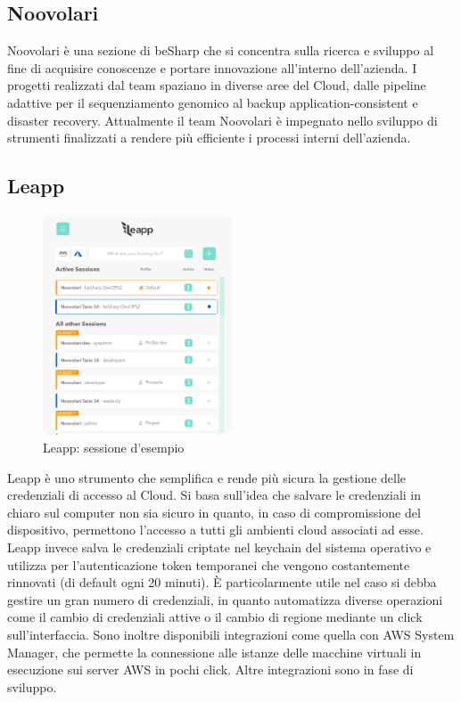 \documentclass[a4paper]{article}
\begin{document}
\subsection{Noovolari}
Noovolari è una sezione di beSharp che si concentra sulla ricerca e sviluppo al fine di acquisire conoscenze e portare innovazione all'interno dell'azienda. I progetti realizzati dal team spaziano in diverse aree del Cloud, dalle pipeline adattive per il sequenziamento genomico al backup application-consistent e disaster recovery. Attualmente il team Noovolari è impegnato nello sviluppo di strumenti finalizzati a rendere più efficiente i processi interni dell'azienda.\cite{noovolari}

\subsection{Leapp}
\begin{figure}[ht]
    \centering
    \includegraphics[width=0.5\textwidth]{Risorse/leapp.png}
    \caption{Leapp: sessione d'esempio}
\end{figure}
Leapp è uno strumento che semplifica e rende più sicura la gestione delle credenziali di accesso al Cloud. Si basa sull'idea che salvare le credenziali in chiaro sul computer non sia sicuro in quanto, in caso di compromissione del dispositivo, permettono l'accesso a tutti gli ambienti cloud associati ad esse. Leapp invece salva le credenziali criptate nel keychain del sistema operativo e utilizza per l'autenticazione token temporanei che vengono costantemente rinnovati (di default ogni 20 minuti). È particolarmente utile nel caso si debba gestire un gran numero di credenziali, in quanto automatizza diverse operazioni come il cambio di credenziali attive o il cambio di regione mediante un click sull'interfaccia. Sono inoltre disponibili integrazioni come quella con AWS System Manager, che permette la connessione alle istanze delle macchine virtuali in esecuzione sui server AWS in pochi click. Altre integrazioni sono in fase di sviluppo.\cite{leapp_github}
\end{document}

